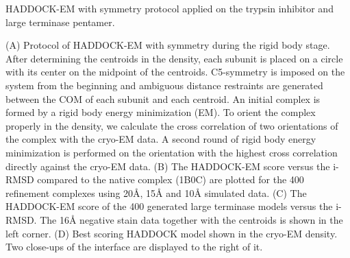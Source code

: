 \caption{HADDOCK-EM with symmetry protocol applied on the trypsin inhibitor and large terminase pentamer.}
{(A) Protocol of HADDOCK-EM with symmetry during the rigid body stage. After determining the centroids in the density, each subunit is placed on a circle with its center on the midpoint of the centroids. C5-symmetry is imposed on the system from the beginning and ambiguous distance restraints are generated between the COM of each subunit and each centroid. An initial complex is formed by a rigid body energy minimization (EM). To orient the complex properly in the density, we calculate the cross correlation of two orientations of the complex with the cryo-EM data. A second round of rigid body energy minimization is performed on the orientation with the highest cross correlation directly against the cryo-EM data. 
 (B) The HADDOCK-EM score versus the i-RMSD compared to the native complex (1B0C) are plotted for the 400 refinement complexes using 20Å, 15Å and 10Å simulated data.
 (C) The HADDOCK-EM score of the 400 generated large terminase models versus the i-RMSD. The 16Å negative stain data together with the centroids is shown in the left corner.
 (D) Best scoring HADDOCK model shown in the cryo-EM density. Two close-ups of the interface are displayed to the right of it.}
 \stopbuffer

